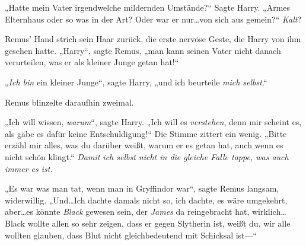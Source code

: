 „Hatte mein Vater irgendwelche mildernden Umstände?“ Sagte Harry. „Armes Elternhaus oder so was in der Art? Oder war er nur…von sich aus gemein?“ \emph{Kalt}?

Remus’ Hand strich sein Haar zurück, die erste nervöse Geste, die Harry von ihm gesehen hatte. „Harry“, sagte Remus, „man kann seinen Vater nicht danach verurteilen, was er als kleiner Junge getan hat!“

„\emph{Ich bin} ein kleiner Junge“, sagte Harry, „und ich beurteile \emph{mich selbst}.“

Remus blinzelte daraufhin zweimal.

„Ich will wissen, \emph{warum}“, sagte Harry. „Ich will es \emph{verstehen}, denn mir scheint es, als gäbe es dafür keine Entschuldigung!“ Die Stimme zittert ein wenig. „Bitte erzähl mir alles, was du darüber weißt, warum er es getan hat, auch wenn es nicht schön klingt.“ \emph{Damit ich selbst nicht in die gleiche Falle tappe, was auch immer es ist.}

„Es war was man tat, wenn man in Gryffindor war“, sagte Remus langsam, widerwillig. „Und…Ich dachte damals nicht so, ich dachte, es wäre umgekehrt, aber…es könnte \emph{Black} gewesen sein, der \emph{James} da reingebracht hat, wirklich…Black wollte allen so sehr zeigen, dass er gegen Slytherin ist, weißt du, wir alle wollten glauben, dass Blut nicht gleichbedeutend mit Schicksal ist—“

\later

